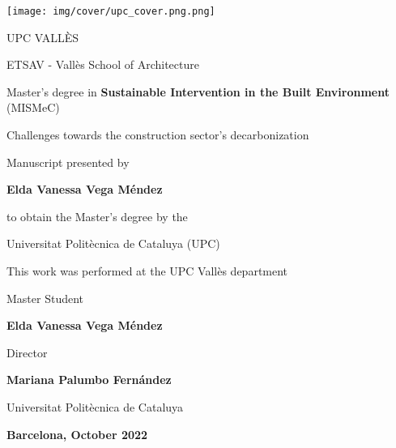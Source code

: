 \begin{titlepage}

\begin{center}
\texttt{[image: img/cover/upc\_cover.png.png]}
  
\vspace*{1ex}
UPC VALLÈS

ETSAV - Vallès School of Architecture

Master's degree in \textbf{Sustainable Intervention in the Built Environment} (MISMeC)

\vspace*{2ex}

{\huge\mdseries Challenges towards the construction sector's decarbonization\par}
\vspace*{2ex}

Manuscript presented by

\textbf{Elda Vanessa Vega Méndez}

to obtain the Master’s degree by the 

Universitat Politècnica de Cataluya (UPC)

\vspace*{3ex}
This work was performed at the UPC Vallès department 

\vfill
\begin{minipage}[b]{1\linewidth}\centering
Master Student
  
\textbf{Elda Vanessa Vega Méndez}
\end{minipage}
\end{center}

\vspace*{5ex}
\begin{minipage}[b]{0.9\linewidth}\centering
Director
  
\textbf{Mariana Palumbo Fernández}

Universitat Politècnica de Cataluya
\end{minipage}

\vspace*{2ex}

\begin{center}
\textbf{Barcelona, October 2022}
\end{center}

\end{titlepage}

